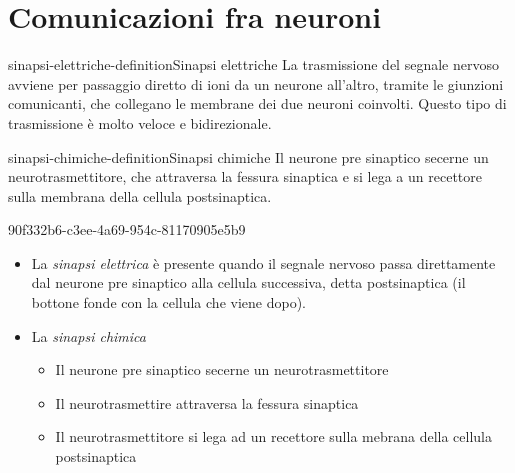 \documentclass[preview]{standalone}
\begin{document}

\section{Comunicazioni fra neuroni}

\begin{snippetdefinition}{sinapsi-elettriche-definition}{Sinapsi elettriche}
    La trasmissione del segnale nervoso avviene per passaggio diretto di ioni da un neurone
    all'altro, tramite le giunzioni comunicanti, che collegano le membrane dei due neuroni
    coinvolti. Questo tipo di trasmissione è molto veloce e bidirezionale.
\end{snippetdefinition}

\begin{snippetdefinition}{sinapsi-chimiche-definition}{Sinapsi chimiche}
    Il neurone pre sinaptico secerne un neurotrasmettitore, che attraversa la fessura sinaptica
    e si lega a un recettore sulla membrana della cellula postsinaptica.
\end{snippetdefinition}

\begin{snippet}{90f332b6-c3ee-4a69-954c-81170905e5b9}
    \begin{itemize}
        \item  La \textit{sinapsi elettrica} è presente quando il segnale nervoso passa direttamente dal
        neurone pre sinaptico alla cellula successiva, detta postsinaptica (il bottone fonde con la cellula che viene dopo).
        \item La \textit{sinapsi chimica}
        \begin{itemize}
            \item Il neurone pre sinaptico secerne un neurotrasmettitore
            \item Il neurotrasmettire attraversa la fessura sinaptica
            \item Il neurotrasmettitore si lega ad un recettore sulla mebrana della cellula postsinaptica
        \end{itemize}
    \end{itemize}
\end{snippet}

\end{document}
